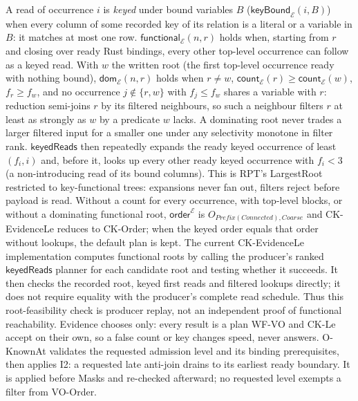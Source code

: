 A read of occurrence $i$ is \emph{keyed} under bound variables $B$
($\mathsf{keyBound}_{\mathcal{E}}(i,B)$) when every column of some recorded key
of its relation is a literal or a variable in $B$: it matches at most one row.
$\mathsf{functional}_{\mathcal{E}}(n,r)$ holds when, starting from $r$ and
closing over ready Rust bindings, every other top-level occurrence can follow as
a keyed read. With $w$ the written root (the first top-level occurrence ready
with nothing bound), $\mathsf{dom}_{\mathcal{E}}(n,r)$ holds when $r\ne w$,
$\mathsf{count}_{\mathcal{E}}(r)\ge\mathsf{count}_{\mathcal{E}}(w)$, $f_r\ge f_w$, and
no occurrence $j\notin\{r,w\}$ with $f_j\le f_w$ shares a variable with $r$: reduction
semi-joins $r$ by its filtered neighbours, so such a neighbour filters $r$ at least as strongly as $w$ by a
predicate $w$ lacks. A dominating root never trades a larger filtered input for a
smaller one under any selectivity monotone in filter rank. $\mathsf{keyedReads}$ then repeatedly expands the ready keyed
occurrence of least $(f_i,i)$ and, before it, looks up every other ready keyed
occurrence with $f_i<3$ (a non-introducing read of its bound columns). This is
RPT's LargestRoot restricted to key-functional trees: expansions never fan out,
filters reject before payload is read. Without a count for every occurrence,
with top-level blocks, or without a dominating functional root, $\mathsf{order}^{\mathcal{E}}$
is $O_{Prefix(Connected),Coarse}$ and CK-EvidenceLe reduces to CK-Order; when the
keyed order equals that order without lookups, the default plan is kept.
The current CK-EvidenceLe implementation computes functional roots by calling
the producer's ranked $\mathsf{keyedReads}$ planner for each candidate root
and testing whether it succeeds. It then checks the recorded root, keyed
first reads and filtered lookups directly; it does not require equality with
the producer's complete read schedule. Thus this root-feasibility check is
producer replay, not an independent proof of functional reachability.
Evidence chooses only: every result is a plan WF-VO and CK-Le accept on their own,
so a false count or key changes speed, never answers. O-KnownAt validates the
requested admission level and its binding prerequisites, then applies I2:
a requested late anti-join drains to its earliest ready boundary. It is
applied before Masks and re-checked afterward; no requested level exempts a
filter from VO-Order.

